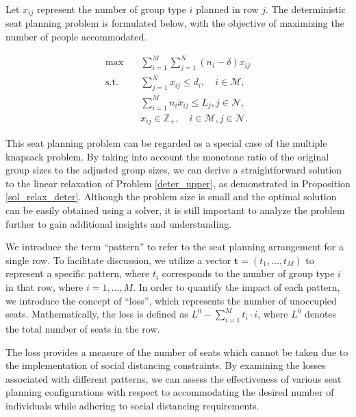 

Let $x_{ij}$ represent the number of group type $i$ planned in row $j$. The deterministic seat planning problem is formulated below, with the objective of maximizing the number of people accommodated.

\begin{equation}\label{deter_upper}
  \begin{aligned}
  \max \quad & \sum_{i=1}^{M}  \sum_{j= 1}^{N} (n_i- \delta) x_{ij} \\
  \text {s.t.} \quad & \sum_{j= 1}^{N} x_{ij} \leq d_{i}, \quad i \in \mathcal{M}, \\
  & \sum_{i=1}^{M} n_{i} x_{ij} \leq L_j, j \in \mathcal{N}, \\
  & x_{ij} \in \mathbb{Z}_{+}, \quad i \in \mathcal{M}, j \in \mathcal{N}.
  \end{aligned}
\end{equation}

This seat planning problem can be regarded as a special case of the multiple knapsack problem. By taking into account the monotone ratio of the original group sizes to the adjusted group sizes, we can derive a straightforward solution to the linear relaxation of Problem \eqref{deter_upper}, as demonstrated in Proposition \ref{sol_relax_deter}. Although the problem size is small and the optimal solution can be easily obtained using a solver, it is still important to analyze the problem further to gain additional insights and understanding.

We introduce the term ``pattern'' to refer to the seat planning arrangement for a single row. To facilitate discussion, we utilize a vector $\bm{t} = (t_1, \ldots, t_M)$ to represent a specific pattern, where $t_i$ corresponds to the number of group type $i$ in that row, where $i= 1,\ldots, M$. In order to quantify the impact of each pattern, we introduce the concept of ``loss'', which represents the number of unoccupied seats. Mathematically, the loss is defined as $L^{0} - \sum_{i =1}^{M} t_i \cdot i$, where $L^{0}$ denotes the total number of seats in the row.

The loss provides a measure of the number of seats which cannot be taken due to the implementation of social distancing constraints. By examining the losses associated with different patterns, we can assess the effectiveness of various seat planning configurations with respect to accommodating the desired number of individuals while adhering to social distancing requirements.

